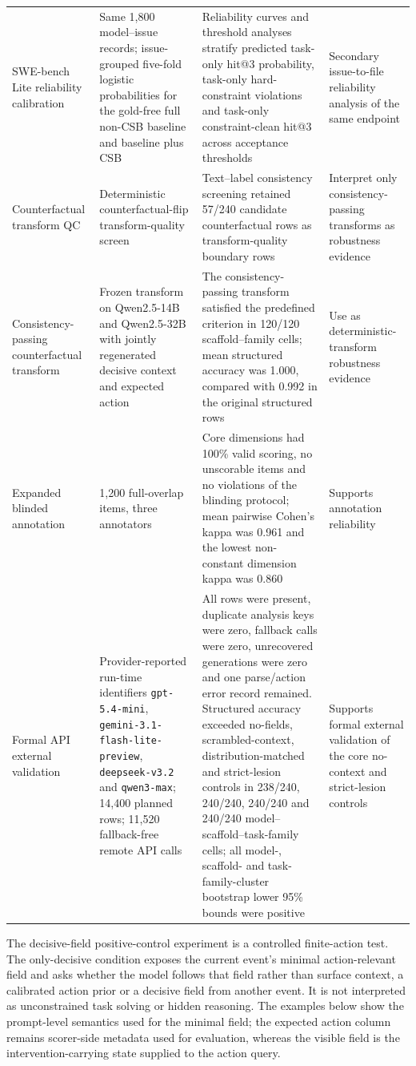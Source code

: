 \documentclass[11pt]{article}
\begin{document}
\begin{longtable}{p{}p{}p{}p{}}
SWE-bench Lite reliability calibration & Same 1,800 model--issue records; issue-grouped five-fold logistic probabilities for the gold-free full non-CSB baseline and baseline plus CSB & Reliability curves and threshold analyses stratify predicted task-only hit@3 probability, task-only hard-constraint violations and task-only constraint-clean hit@3 across acceptance thresholds & Secondary issue-to-file reliability analysis of the same endpoint \\
Counterfactual transform QC & Deterministic counterfactual-flip transform-quality screen & Text--label consistency screening retained 57/240 candidate counterfactual rows as transform-quality boundary rows & Interpret only consistency-passing transforms as robustness evidence \\
Consistency-passing counterfactual transform & Frozen transform on Qwen2.5-14B and Qwen2.5-32B with jointly regenerated decisive context and expected action & The consistency-passing transform satisfied the predefined criterion in 120/120 scaffold--family cells; mean structured accuracy was 1.000, compared with 0.992 in the original structured rows & Use as deterministic-transform robustness evidence \\
Expanded blinded annotation & 1,200 full-overlap items, three annotators & Core dimensions had 100\% valid scoring, no unscorable items and no violations of the blinding protocol; mean pairwise Cohen's kappa was 0.961 and the lowest non-constant dimension kappa was 0.860 & Supports annotation reliability \\
Formal API external validation & Provider-reported run-time identifiers \texttt{gpt-5.4-mini}, \texttt{gemini-3.1-flash-lite-preview}, \texttt{deepseek-v3.2} and \texttt{qwen3-max}; 14,400 planned rows; 11,520 fallback-free remote API calls & All rows were present, duplicate analysis keys were zero, fallback calls were zero, unrecovered generations were zero and one parse/action error record remained. Structured accuracy exceeded no-fields, scrambled-context, distribution-matched and strict-lesion controls in 238/240, 240/240, 240/240 and 240/240 model--scaffold--task-family cells; all model-, scaffold- and task-family-cluster bootstrap lower 95\% bounds were positive & Supports formal external validation of the core no-context and strict-lesion controls \\
\bottomrule
\end{longtable}
\normalsize

The decisive-field positive-control experiment is a controlled finite-action test. The only-decisive condition exposes the current event's minimal action-relevant field and asks whether the model follows that field rather than surface context, a calibrated action prior or a decisive field from another event. It is not interpreted as unconstrained task solving or hidden reasoning. The examples below show the prompt-level semantics used for the minimal field; the expected action column remains scorer-side metadata used for evaluation, whereas the visible field is the intervention-carrying state supplied to the action query.
\end{document}
